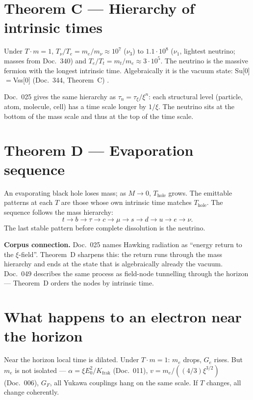 \section{Theorem C --- Hierarchy of intrinsic times}

\begin{theorem}
Under $T\cdot m=1$, $T_\nu/T_e=m_e/m_\nu\approx10^7$ ($\nu_3$) to
$1.1\cdot10^8$ ($\nu_1$, lightest neutrino; masses from Doc.~340) and
$T_e/T_t=m_t/m_e\approx3\cdot10^5$. The neutrino is the massive fermion with
the longest intrinsic time. Algebraically it is the vacuum state:
Su[0]$=$Vss[0] (Doc.~344, Theorem~C) \BM.
\end{theorem}

Doc.~025 gives the same hierarchy as $\tau_n=\tau_\xi/\xi^n$: each structural
level (particle, atom, molecule, cell) has a time scale longer by $1/\xi$.
The neutrino sits at the bottom of the mass scale and thus at the top of the
time scale.

\section{Theorem D --- Evaporation sequence}

\begin{theorem}
An evaporating black hole loses mass; as $M\to0$, $T_\text{hole}$ grows. The
emittable patterns at each $T$ are those whose own intrinsic time matches
$T_\text{hole}$. The sequence follows the mass hierarchy:
\[
  t\to b\to\tau\to c\to\mu\to s\to d\to u\to e\to\nu.
\]
The last stable pattern before complete dissolution is the neutrino.
\end{theorem}

\textbf{Corpus connection.} Doc.~025 names Hawking radiation as ``energy
return to the $\xi$-field''. Theorem~D sharpens this: the return runs
through the mass hierarchy and ends at the state that is algebraically
already the vacuum. Doc.~049 describes the same process as field-node
tunnelling through the horizon --- Theorem~D orders the nodes by intrinsic
time.

\section{What happens to an electron near the horizon \SM}

Near the horizon local time is dilated. Under $T\cdot m=1$: $m_e$ drops,
$G_e$ rises. But $m_e$ is not isolated --- $\alpha=\xi E_0^2/K_\text{frak}$
(Doc.~011), $v=m_e/((4/3)\xi^{3/2})$ (Doc.~006), $G_F$, all Yukawa couplings
hang on the same scale. If $T$ changes, all change coherently.

